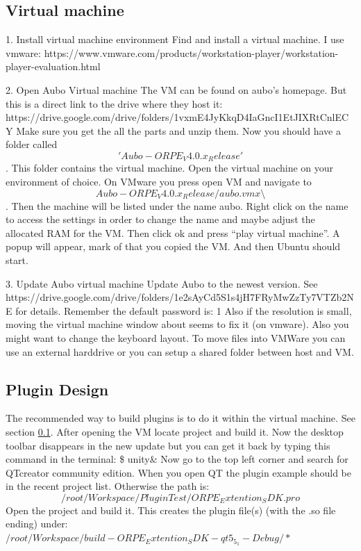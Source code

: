 \documentclass{article}
\begin{document}
\subsection{Virtual machine}
\label{sec:virtual}

1.	Install virtual machine environment
Find and install a virtual machine. I use vmware: https://www.vmware.com/products/workstation-player/workstation-player-evaluation.html

2.	Open Aubo Virtual machine
The VM can be found on aubo’s homepage. But this is a direct link to the drive where they host it:  https://drive.google.com/drive/folders/1vxmE4JyKkqD4IaGncI1EtJIXRtCnlECY 
Make sure you get the all the parts and unzip them. Now you should have a folder called $$'Aubo-ORPE_V4.0.x_Release'$$ . This folder contains the virtual machine. 
Open the virtual machine on your environment of choice. 
On VMware you press open VM and navigate to $$Aubo-ORPE_V4.0.x_Release/ aubo.vmx\setminus$$ . Then the machine will be listed under the name aubo. Right click on the name to access the settings in order to change the name and maybe adjust the allocated RAM for the VM. Then click ok and press “play virtual machine”.  A popup will appear, mark of that you copied the VM. And then Ubuntu should start. 

3.	Update Aubo virtual machine
Update Aubo to the newest version. See https://drive.google.com/drive/folders/1e2sAyCd5S1s4jH7FRyMwZzTy7VTZb2NE for details. 
Remember the default password is: 1 
Also if the resolution is small, moving the virtual machine window about seems to fix it (on vmware). 
Also you might want to change the keyboard layout. 
To move files into VMWare you can use an external harddrive or you can setup a shared folder between host and VM.

\subsection{Plugin Design}

The recommended way to build plugins is to do it within the virtual machine. See section \ref{sec:virtual}. 
After opening the VM locate project and build it.
Now the desktop toolbar disappears in the new update but you can get it back by typing this command in the terminal: 
\$ unity\& 
Now go to the top left corner and search for QTcreator community edition. 
When you open QT the plugin example should be in the recent project list. Otherwise the path is: $$/root/Workspace/PluginTest/ORPE_Extention_SDK.pro$$
Open the project and build it. 
This creates the plugin file(s) (with  the .so file ending) under: $/root/Workspace/build-ORPE_Extention_SDK-qt5_{5_1}-Debug/*$
\end{document}
